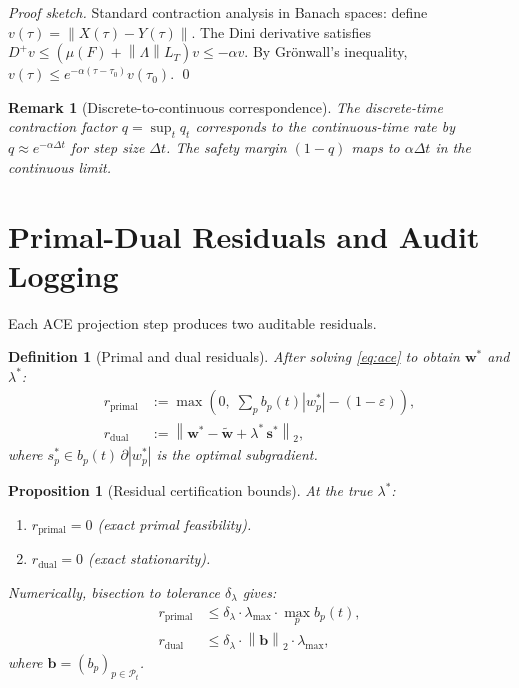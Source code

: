 \documentclass[12pt,letterpaper]{article}
\newtheorem{proposition}[theorem]{Proposition}
\newtheorem{definition}[theorem]{Definition}
\newtheorem{remark}[theorem]{Remark}
\newcommand{\Hnorm}[1]{\left\|#1\right\|}
\newcommand{\bp}{b_p(t)}
\newcommand{\qt}{q_t}
\newcommand{\Pt}{\mathcal{P}_t}
\newcommand{\eps}{\varepsilon}
\newcommand{\lam}{\lambda}
\newcommand{\lamstar}{\lambda^*}
\begin{document}
\begin{proof}[Proof sketch]
Standard contraction analysis in Banach spaces: define
$v(\tau) = \Hnorm{X(\tau) - Y(\tau)}$. The Dini derivative satisfies
$D^+ v \leq (\mu(F) + \Hnorm{\Lambda}L_T) v \leq -\alpha v$. By
Gr\"{o}nwall's inequality, $v(\tau) \leq e^{-\alpha(\tau-\tau_0)}v(\tau_0)$.
\qed
\end{proof}

\begin{remark}[Discrete-to-continuous correspondence]
The discrete-time contraction factor $q = \sup_t \qt$ corresponds to
the continuous-time rate by $q \approx e^{-\alpha \Delta t}$ for step
size $\Delta t$. The safety margin $(1-q)$ maps to $\alpha \Delta t$ in
the continuous limit.
\end{remark}

\section{Primal-Dual Residuals and Audit Logging}
\label{sec:residuals}

Each ACE projection step produces two auditable residuals.

\begin{definition}[Primal and dual residuals]
After solving \eqref{eq:ace} to obtain $\mathbf{w}^*$ and $\lamstar$:
\begin{align}
  r_{\mathrm{primal}} &:= \max\!\left(0,\;
    \sum_p \bp |w_p^*| - (1-\eps)\right), \label{eq:primal-res}\\
  r_{\mathrm{dual}} &:= \left\| \mathbf{w}^* - \tilde{\mathbf{w}}
    + \lamstar\, \mathbf{s}^* \right\|_2, \label{eq:dual-res}
\end{align}
where $s_p^* \in \bp\,\partial|w_p^*|$ is the optimal subgradient.
\end{definition}

\begin{proposition}[Residual certification bounds]
\label{prop:residuals}
At the true $\lamstar$:
\begin{enumerate}[label=(\alph*)]
  \item $r_{\mathrm{primal}} = 0$ (exact primal feasibility).
  \item $r_{\mathrm{dual}} = 0$ (exact stationarity).
\end{enumerate}
Numerically, bisection to tolerance $\delta_\lambda$ gives:
\begin{align}
  r_{\mathrm{primal}} &\leq \delta_\lambda \cdot \lam_{\max} \cdot
    \max_p \bp, \label{eq:primal-tol}\\
  r_{\mathrm{dual}}   &\leq \delta_\lambda \cdot \Hnorm{\mathbf{b}}_2 \cdot
    \lam_{\max}, \label{eq:dual-tol}
\end{align}
where $\mathbf{b} = (b_p)_{p \in \Pt}$.
\end{proposition}
\end{document}
